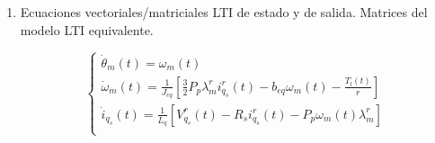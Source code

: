 \documentclass{article}
\begin{document}
\begin{enumerate}[label=\roman*.]
    \item Ecuaciones vectoriales/matriciales LTI de estado y de salida. 
    Matrices del modelo LTI equivalente.

    \begin{equation}
        \begin{cases}
            \dot{\theta}_{m}(t) = \omega_{m}(t)\\
            \dot{\omega}_{m}(t) = \frac{1}{J_{eq}}[\frac{3}{2}P_{p}\lambda_{m}^ri_{q_{s}}^r(t) - b_{eq}\omega_{m}(t) - \frac{T_{l}(t)}{r}]\\
            \dot{i}_{q_{s}}(t) = \frac{1}{L_{q}}[V_{q_{s}}^r(t) - R_{s}i_{q_{s}}^r(t) - P_{p}\omega_{m}(t)\lambda_{m}^r]  \\
        \end{cases}
    \end{equation}


\end{enumerate}
\end{document}
